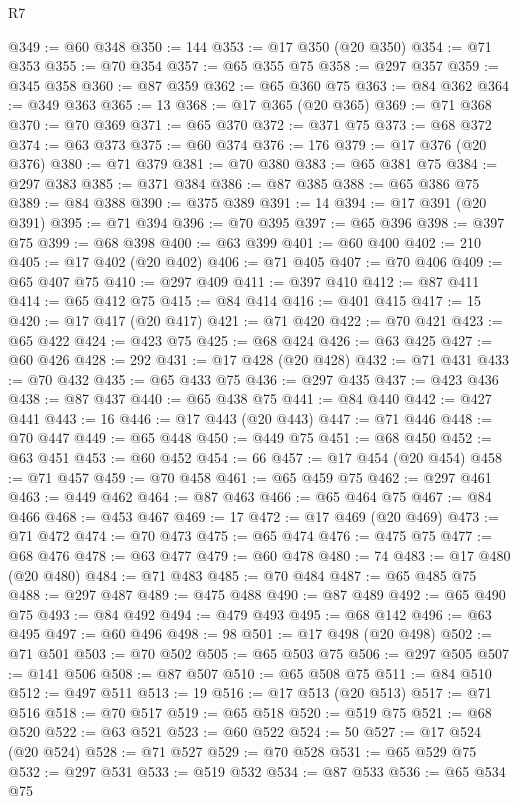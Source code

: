 \begin{lexlean}{R7}
\begin{coremodule}
@349 := @60 @348
@350 := 144
@353 := @17 @350 (@20 @350)
@354 := @71 @353
@355 := @70 @354
@357 := @65 @355 @75
@358 := @297 @357
@359 := @345 @358
@360 := @87 @359
@362 := @65 @360 @75
@363 := @84 @362
@364 := @349 @363
@365 := 13
@368 := @17 @365 (@20 @365)
@369 := @71 @368
@370 := @70 @369
@371 := @65 @370
@372 := @371 @75
@373 := @68 @372
@374 := @63 @373
@375 := @60 @374
@376 := 176
@379 := @17 @376 (@20 @376)
@380 := @71 @379
@381 := @70 @380
@383 := @65 @381 @75
@384 := @297 @383
@385 := @371 @384
@386 := @87 @385
@388 := @65 @386 @75
@389 := @84 @388
@390 := @375 @389
@391 := 14
@394 := @17 @391 (@20 @391)
@395 := @71 @394
@396 := @70 @395
@397 := @65 @396
@398 := @397 @75
@399 := @68 @398
@400 := @63 @399
@401 := @60 @400
@402 := 210
@405 := @17 @402 (@20 @402)
@406 := @71 @405
@407 := @70 @406
@409 := @65 @407 @75
@410 := @297 @409
@411 := @397 @410
@412 := @87 @411
@414 := @65 @412 @75
@415 := @84 @414
@416 := @401 @415
@417 := 15
@420 := @17 @417 (@20 @417)
@421 := @71 @420
@422 := @70 @421
@423 := @65 @422
@424 := @423 @75
@425 := @68 @424
@426 := @63 @425
@427 := @60 @426
@428 := 292
@431 := @17 @428 (@20 @428)
@432 := @71 @431
@433 := @70 @432
@435 := @65 @433 @75
@436 := @297 @435
@437 := @423 @436
@438 := @87 @437
@440 := @65 @438 @75
@441 := @84 @440
@442 := @427 @441
@443 := 16
@446 := @17 @443 (@20 @443)
@447 := @71 @446
@448 := @70 @447
@449 := @65 @448
@450 := @449 @75
@451 := @68 @450
@452 := @63 @451
@453 := @60 @452
@454 := 66
@457 := @17 @454 (@20 @454)
@458 := @71 @457
@459 := @70 @458
@461 := @65 @459 @75
@462 := @297 @461
@463 := @449 @462
@464 := @87 @463
@466 := @65 @464 @75
@467 := @84 @466
@468 := @453 @467
@469 := 17
@472 := @17 @469 (@20 @469)
@473 := @71 @472
@474 := @70 @473
@475 := @65 @474
@476 := @475 @75
@477 := @68 @476
@478 := @63 @477
@479 := @60 @478
@480 := 74
@483 := @17 @480 (@20 @480)
@484 := @71 @483
@485 := @70 @484
@487 := @65 @485 @75
@488 := @297 @487
@489 := @475 @488
@490 := @87 @489
@492 := @65 @490 @75
@493 := @84 @492
@494 := @479 @493
@495 := @68 @142
@496 := @63 @495
@497 := @60 @496
@498 := 98
@501 := @17 @498 (@20 @498)
@502 := @71 @501
@503 := @70 @502
@505 := @65 @503 @75
@506 := @297 @505
@507 := @141 @506
@508 := @87 @507
@510 := @65 @508 @75
@511 := @84 @510
@512 := @497 @511
@513 := 19
@516 := @17 @513 (@20 @513)
@517 := @71 @516
@518 := @70 @517
@519 := @65 @518
@520 := @519 @75
@521 := @68 @520
@522 := @63 @521
@523 := @60 @522
@524 := 50
@527 := @17 @524 (@20 @524)
@528 := @71 @527
@529 := @70 @528
@531 := @65 @529 @75
@532 := @297 @531
@533 := @519 @532
@534 := @87 @533
@536 := @65 @534 @75

\end{coremodule}
\end{lexlean}
